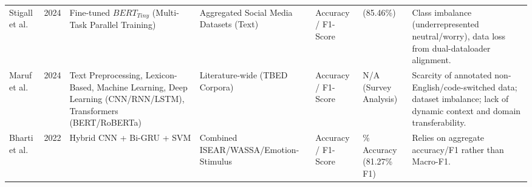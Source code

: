 \documentclass[conference]{IEEEtran}
\begin{document}
\begin{table}[t]
\begin{tabularx}{\textwidth}{@{} >{\hsize=0.85\hsize}X c >{\hsize=1.05\hsize}X >{\hsize=1.0\hsize}X >{\hsize=0.85\hsize}X >{\hsize=1.05\hsize}X >{\hsize=1.2\hsize}X @{}}
Stigall et al. \cite{stigall2024large} & 2024 & Fine-tuned $BERT_{Tiny}$ (Multi-Task Parallel Training) & Aggregated Social Media Datasets (Text) & Accuracy / F1-Score & 0.8546 (85.46\%) & Class imbalance (underrepresented neutral/worry), data loss from dual-dataloader alignment. \\
\addlinespace

Maruf et al. \cite{maruf2024challenges} & 2024 & Text Preprocessing, Lexicon-Based, Machine Learning, Deep Learning (CNN/RNN/LSTM), Transformers (BERT/RoBERTa) & Literature-wide (TBED Corpora) & Accuracy / F1-Score & N/A (Survey Analysis) & Scarcity of annotated non-English/code-switched data; dataset imbalance; lack of dynamic context and domain transferability. \\
\addlinespace

Bharti et al. \cite{bharti_2022_computational} & 2022 & Hybrid CNN + Bi-GRU + SVM & Combined ISEAR/WASSA/Emotion-Stimulus & Accuracy / F1-Score & 80.11\% Accuracy (81.27\% F1) & Relies on aggregate accuracy/F1 rather than Macro-F1. \\

\bottomrule
\end{tabularx}
\end{table}
\end{document}
